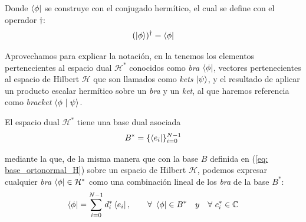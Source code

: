 \documentclass{article}
\numberwithin{equation}{section} %
\begin{document}
    \vspace{1.5mm}

    Donde \( \bra{\phi} \) se construye con el conjugado hermítico, el cual se define con el operador \( \dagger \):
    \begin{equation*}
        ( \ket{\phi} )^{\dagger} = \bra{\phi}
    \end{equation*}

    \vspace{1.5mm}

    Aprovechamos para explicar la notación, en la tenemos los elementos pertenecientes al espacio dual \( \mathcal{H} ^ {*} \) conocidos como \textit{bra} \( \bra{\phi} \), vectores pertenecientes al espacio de Hilbert \( \mathcal{H} \) que son llamados como \textit{kets} \( \ket{\psi} \), y el resultado de aplicar un producto escalar hermítico sobre un \textit{bra} y un \textit{ket}, al que haremos referencia como \textit{bracket} \( \braket{\phi \ | \ \psi} \).

    \vspace{5mm}

    El espacio dual \( \mathcal{H} ^ {*} \) tiene una base dual asociada
    \begin{equation}
        B ^ {*} = \{ \bra{e_{i}} \} _{i = 0}^{N - 1}
    \end{equation}

    \vspace{1.5mm}

    mediante la que, de la misma manera que con la base \( B \) definida en (\ref{eq: base_ortonormal_H}) sobre un espacio de Hilbert \( \mathcal{H} \), podemos expresar cualquier \textit{bra} \( \bra{\phi} \in \mathcal{H} ^ {*} \) como una combinación lineal de los \textit{bra} de la base \( B ^ {*} \):
    \begin{equation}
        \bra{\phi} = \sum_{i = 0}^{N - 1} d_{i}^{*} \bra{e_{i}}, \qquad \forall \ \bra{\phi} \in B^{*} \quad y \quad \forall \ c_{i}^{*} \in \mathbb{C}
        \label{eq: combinacion_lineal_hilbert_dual}
    \end{equation}    

    \vspace{1.5mm}
\end{document}
